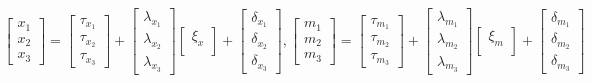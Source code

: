 \documentclass[
  man]{apa6}
\begin{document}
\begin{align}
    \begin{bmatrix}
        x_{1} \\
        x_{2} \\ 
        x_{3}
    \end{bmatrix} =
    \begin{bmatrix}
        \tau_{x_{1}} \\
        \tau_{x_{2}} \\ 
        \tau_{x_{3}}
    \end{bmatrix} +
    \begin{bmatrix}
        \lambda_{x_{1}} \\
        \lambda_{x_{2}} \\ 
        \lambda_{x_{3}}
    \end{bmatrix}
    \begin{bmatrix}
        \xi_{x} \\
    \end{bmatrix} +
    \begin{bmatrix}
        \delta_{x_{1}} \\
        \delta_{x_{2}} \\ 
        \delta_{x_{3}}
    \end{bmatrix}, %
    \begin{bmatrix}
        m_{1} \\
        m_{2} \\ 
        m_{3}
    \end{bmatrix} =
    \begin{bmatrix}
        \tau_{m_{1}} \\
        \tau_{m_{2}} \\ 
        \tau_{m_{3}}
    \end{bmatrix} +
    \begin{bmatrix}
        \lambda_{m_{1}} \\
        \lambda_{m_{2}} \\ 
        \lambda_{m_{3}}
    \end{bmatrix}
    \begin{bmatrix}
        \xi_{m} \\
    \end{bmatrix} +
    \begin{bmatrix}
        \delta_{m_{1}} \\
        \delta_{m_{2}} \\ 
        \delta_{m_{3}}
    \end{bmatrix}
\end{align}
\end{document}
